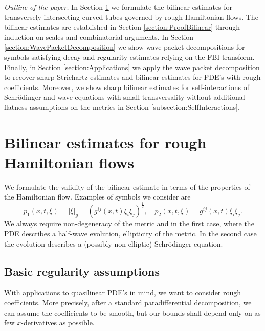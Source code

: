 \documentclass{amsart}
\theoremstyle{definition}
\begin{document}
\emph{Outline of the paper.} In Section \ref{section:BilinearRoughEstimates} we formulate the bilinear estimates for transversely intersecting curved tubes governed by rough Hamiltonian flows. The bilinear estimates are established in Section \ref{section:ProofBilinear} through induction-on-scales and combinatorial arguments. In Section \ref{section:WavePacketDecomposition} we show wave packet decompositions for symbols satisfying decay and regularity estimates relying on the FBI transform. Finally, in Section \ref{section:Applications} we apply the wave packet decomposition to recover sharp Strichartz estimates and bilinear estimates for PDE's with rough coefficients. Moreover, we show sharp bilinear estimates for self-interactions of Schr\"odinger and wave equations with small transversality without additional flatness assumptions on the metrics in Section \ref{subsection:SelfInteractions}.

\section{Bilinear estimates for rough Hamiltonian flows}
\label{section:BilinearRoughEstimates}

We formulate the validity of the bilinear estimate in terms of the properties of the Hamiltonian flow. Examples of symbols we consider are
\begin{equation*}
p_1(x,t,\xi) = |\xi|_{g} = (g^{ij}(x,t) \xi_i \xi_j)^{\frac{1}{2}}, \quad p_2(x,t,\xi) = g^{ij}(x,t) \xi_i \xi_j.
\end{equation*}
We always require non-degeneracy of the metric and in the first case, where the PDE describes a half-wave evolution,  ellipticity of the metric. In the second case the evolution describes a (possibly non-elliptic) Schr\"odinger equation.

\subsection{Basic regularity assumptions}
With applications to quasilinear PDE's in mind, we want to consider rough coefficients. More precisely, after a standard paradifferential decomposition, we can assume the coefficients to be smooth, but our bounds shall depend only on as few $x$-derivatives as possible.
\end{document}
